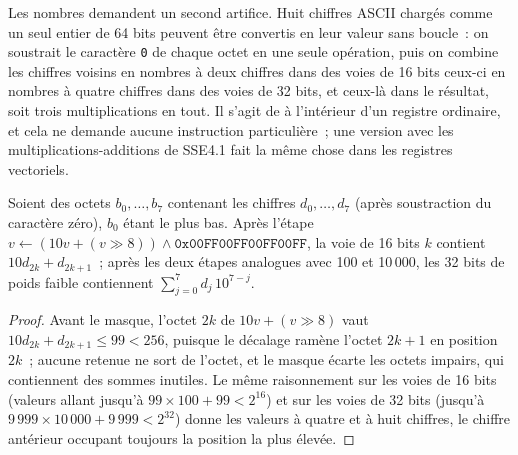 \label{lst:ll:vector-instructions-and-data-parallel-code:rust}

Les nombres demandent un second artifice. Huit chiffres ASCII chargés comme un seul entier de 64 bits peuvent être convertis en leur valeur sans boucle~:
on soustrait le caractère \texttt{0} de chaque octet en une seule opération, puis on combine les chiffres voisins en nombres à deux chiffres dans des voies de 16 bits
ceux-ci en nombres à quatre chiffres dans des voies de 32 bits, et ceux-là dans le résultat, soit trois multiplications en tout. Il s'agit de 
à l'intérieur d'un registre ordinaire, et cela ne demande aucune instruction particulière~; une version avec les multiplications-additions de SSE4.1 fait la même chose dans les
registres vectoriels.

\label{lst:ll:vector-instructions-and-data-parallel-code:swar}

\begin{proposition}\label{prop:ll:vector-instructions-and-data-parallel-code:swar}
Soient des octets $b_0,\dots,b_7$ contenant les chiffres $d_0,\dots,d_7$ (après soustraction du caractère zéro), $b_0$ étant le plus bas. Après
l'étape $v \leftarrow (10v + (v \gg 8)) \wedge \mathtt{0x00FF00FF00FF00FF}$, la voie de 16 bits $k$ contient $10 d_{2k} + d_{2k+1}$~;
après les deux étapes analogues avec 100 et 10\,000, les 32 bits de poids faible contiennent $\sum_{j=0}^{7} d_j\, 10^{7-j}$.
\end{proposition}

\begin{proof}
Avant le masque, l'octet $2k$ de $10v + (v \gg 8)$ vaut $10 d_{2k} + d_{2k+1} \le 99 < 256$, puisque le décalage ramène l'octet $2k+1$
en position $2k$~; aucune retenue ne sort de l'octet, et le masque écarte les octets impairs, qui contiennent des sommes inutiles. Le même
raisonnement sur les voies de 16 bits (valeurs allant jusqu'à $99 \times 100 + 99 < 2^{16}$) et sur les voies de 32 bits (jusqu'à $9\,999 \times 10\,000 +
9\,999 < 2^{32}$) donne les valeurs à quatre et à huit chiffres, le chiffre antérieur occupant toujours la position la plus élevée.
\end{proof}

